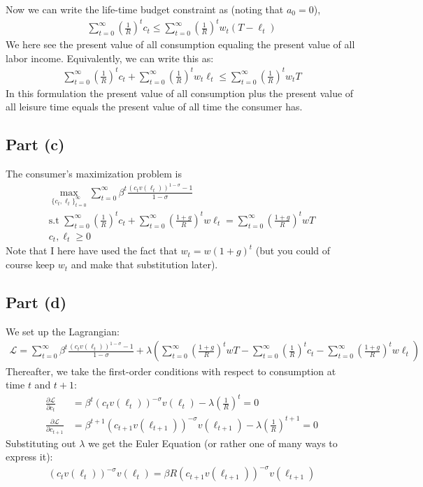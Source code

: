 \documentclass{scrartcl}
\newcommand{\lep}{\left(}
\newcommand{\rip}{\right)}
\begin{document}
Now we can write the life-time budget constraint as (noting that $a_0 = 0$), 
\begin{align*}
	\sum_{t=0}^{\infty} \lep\frac{1}{R} \rip^t c_t \leq \sum_{t=0}^{\infty} \lep\frac{1}{R} \rip^t w_t(T-\ell_t)
\end{align*}
We here see the present value of all consumption equaling the present value of all labor income. Equivalently, we can write this as: 
\begin{align*}
	\sum_{t=0}^{\infty} \lep\frac{1}{R} \rip^t c_t + \sum_{t=0}^{\infty} \lep\frac{1}{R} \rip^t w_t \ell_t \leq \sum_{t=0}^{\infty} \lep\frac{1}{R} \rip^t w_tT
\end{align*}
In this formulation the present value of all consumption plus the present value of all leisure time equals the present value of all time the consumer has. 
\subsection*{Part (c)}
The consumer's maximization problem is
\begin{gather}
	\max_{\{c_t, \ell_t\}_{t=0}^{\infty}} 
	\sum_{t=0}^{\infty} \beta^t \frac{(c_tv(\ell_t))^{1-\sigma}-1}{1-\sigma}\\
	\text{s.t } \sum_{t=0}^{\infty} \lep\frac{1}{R} \rip^t c_t + 
	\sum_{t=0}^{\infty} \lep\frac{1+g}{R} \rip^t w \ell_t = 
	\sum_{t=0}^{\infty} \lep\frac{1+g}{R} \rip^t w T \label{eq:1_bc}\\
	c_t, \ell_t \geq 0
\end{gather}
Note that I here have used the fact that $w_t = w(1+g)^t$ (but you could of course keep $w_t$ and make that substitution later). 

\subsection*{Part (d)}
We set up the Lagrangian: 
\begin{align*}
	\mathcal{L} = 
	\sum_{t=0}^{\infty} \beta^t \frac{(c_tv(\ell_t))^{1-\sigma}-1}{1-\sigma} + 
	\lambda \lep\sum_{t=0}^{\infty} \lep\frac{1+g}{R} \rip^t w T - \sum_{t=0}^{\infty} \lep\frac{1}{R} \rip^t c_t - 
	\sum_{t=0}^{\infty} \lep\frac{1+g}{R} \rip^t w \ell_t \rip
\end{align*}
Thereafter, we take the first-order conditions with respect to consumption at time $t$ and $t+1$: 
\begin{align}
	\frac{\partial \mathcal{L}}{\partial c_t} &= 
	\beta^t \lep c_tv(\ell_t) \rip^{-\sigma}v(\ell_t) - \lambda \lep \frac{1}{R}\rip^t = 0 \label{eq:1_FOC_ct}\\
	\frac{\partial \mathcal{L}}{\partial c_{t+1}} &= 
	\beta^{t+1} \lep c_{t+1}v(\ell_{t+1}) \rip^{-\sigma}v(\ell_{t+1}) - \lambda \lep \frac{1}{R}\rip^{t+1} = 0 
\end{align}
Substituting out $\lambda$ we get the Euler Equation (or rather one of many ways to express it): 
\begin{gather} 
	\lep c_tv(\ell_t) \rip^{-\sigma}v(\ell_t) = \beta R \lep c_{t+1}v(\ell_{t+1}) \rip^{-\sigma}v(\ell_{t+1}) \label{eq:1_EE}
\end{gather}
\end{document}
